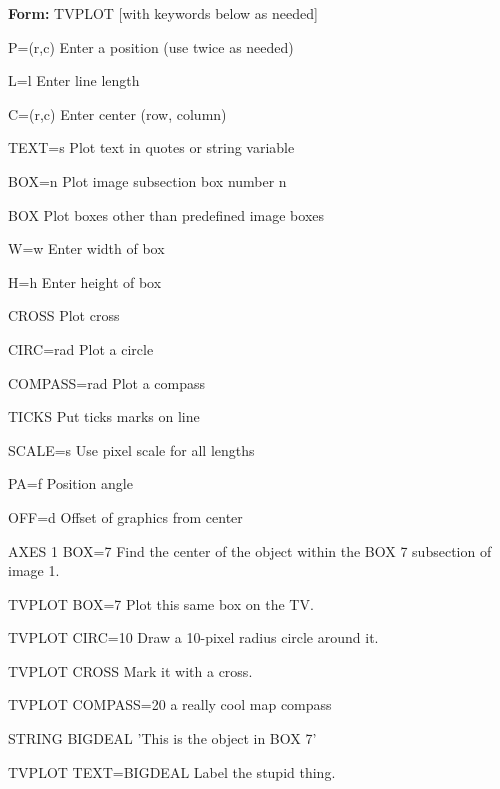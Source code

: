 {\newpage\clearpage
{}%
\begin{command}
  \item[\textbf{Form: }TVPLOT {[with keywords below as needed]}\hfill]{}
  \item[P=(r,c)]{         Enter a position (use twice as needed)}
  \item[L=l]{             Enter line length}
  \item[C=(r,c)]{         Enter center (row, column)}
  \item[TEXT=s]{          Plot text in quotes or string variable}
  \item[BOX=n]{           Plot image subsection box number n}
  \item[BOX]{             Plot boxes other than predefined image boxes}
  \item[W=w]{             Enter width of box}
  \item[H=h]{             Enter height of box}
  \item[CROSS]{           Plot cross}
  \item[CIRC=rad]{        Plot a circle}
  \item[COMPASS=rad]{     Plot a compass}
  \item[TICKS]{           Put ticks marks on line}
  \item[SCALE=s]{         Use pixel scale for all lengths}
  \item[PA=f]{            Position angle}
  \item[OFF=d]{           Offset of graphics from center}
\end{command}%
\lthtmlfigureZ
\lthtmlcheckvsize\clearpage}

{\newpage\clearpage
{}%
\begin{example}
  \item[AXES 1 BOX=7\hfill]{Find the center of the object within
       the BOX 7 subsection of image 1.}
  \item[TVPLOT BOX=7\hfill]{Plot this same box on the TV.}
  \item[TVPLOT CIRC=10\hfill]{Draw a 10-pixel radius circle around it.}
  \item[TVPLOT CROSS\hfill]{Mark it with a cross.}
  \item[TVPLOT COMPASS=20\hfill]{a really cool map compass}
  \item[STRING BIGDEAL  'This is the object in BOX 7']{}
  \item[TVPLOT TEXT=BIGDEAL\hfill]{Label the stupid thing.}
\end{example}%
\lthtmlfigureZ
\lthtmlcheckvsize\clearpage}

